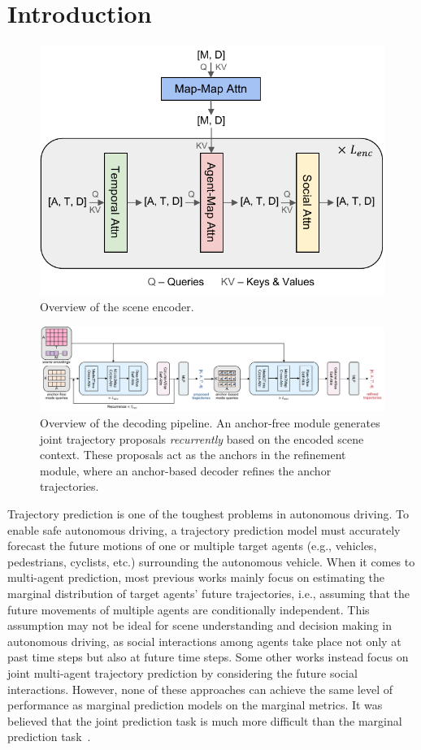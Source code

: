 \documentclass[10pt,twocolumn,letterpaper]{article}
\begin{document}
\section{Introduction}
\label{sec:intro}

\begin{figure}[t]
  \centering
  \includegraphics[width=0.8\linewidth]{cubic_encoder.pdf}
      \caption{Overview of the scene encoder.}
  \label{fig:cubic_encoder}
\end{figure}

\begin{figure}[t]
  \centering
  \includegraphics[width=1.0\linewidth]{joint_decoder.pdf}
      \caption{Overview of the decoding pipeline. An anchor-free module generates joint trajectory proposals \textit{recurrently} based on the encoded scene context. These proposals act as the anchors in the refinement module, where an anchor-based decoder refines the anchor trajectories.}
  \label{fig:joint_decoder}
\end{figure}

Trajectory prediction is one of the toughest problems in autonomous driving. To enable safe autonomous driving, a trajectory prediction model must accurately forecast the future motions of one or multiple target agents (e.g., vehicles, pedestrians, cyclists, etc.) surrounding the autonomous vehicle. When it comes to multi-agent prediction, most previous works mainly focus on estimating the marginal distribution of target agents' future trajectories, i.e., assuming that the future movements of multiple agents are conditionally independent. This assumption may not be ideal for scene understanding and decision making in autonomous driving, as social interactions among agents take place not only at past time steps but also at future time steps. Some other works instead focus on joint multi-agent trajectory prediction by considering the future social interactions. However, none of these approaches can achieve the same level of performance as marginal prediction models on the marginal metrics. It was believed that the joint prediction task is much more difficult than the marginal prediction task~\cite{ngiam2021scene}.
\end{document}
